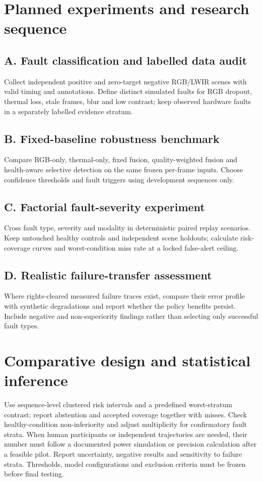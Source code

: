 \documentclass[11pt,a4paper]{article}
\begin{document}
\section{Planned experiments and research sequence}
\subsection{A. Fault classification and labelled data audit}
Collect independent positive and zero-target negative RGB/LWIR scenes with valid timing and annotations. Define distinct simulated faults for RGB dropout, thermal loss, stale frames, blur and low contrast; keep observed hardware faults in a separately labelled evidence stratum.

\subsection{B. Fixed-baseline robustness benchmark}
Compare RGB-only, thermal-only, fixed fusion, quality-weighted fusion and health-aware selective detection on the same frozen per-frame inputs. Choose confidence thresholds and fault triggers using development sequences only.

\subsection{C. Factorial fault-severity experiment}
Cross fault type, severity and modality in deterministic paired replay scenarios. Keep untouched healthy controls and independent scene holdouts; calculate risk-coverage curves and worst-condition miss rate at a locked false-alert ceiling.

\subsection{D. Realistic failure-transfer assessment}
Where rights-cleared measured failure traces exist, compare their error profile with synthetic degradations and report whether the policy benefits persist. Include negative and non-superiority findings rather than selecting only successful fault types.

\section{Comparative design and statistical inference}
Use sequence-level clustered risk intervals and a predefined worst-stratum contrast; report abstention and accepted coverage together with misses. Check healthy-condition non-inferiority and adjust multiplicity for confirmatory fault strata. When human participants or independent trajectories are needed, their number must follow a documented power simulation or precision calculation after a feasible pilot. Report uncertainty, negative results and sensitivity to failure strata. Thresholds, model configurations and exclusion criteria must be frozen before final testing.
\end{document}
